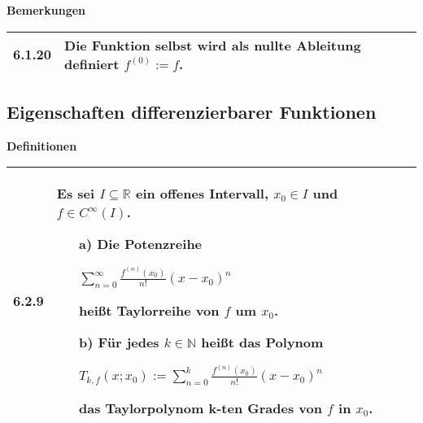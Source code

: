     \noindent
    \textbf{Bemerkungen}
    \begin{table}[H]
    \begin{tabularx}{\textwidth}{X m{16cm}}
        \toprule

        6.1.20& Die Funktion selbst wird als nullte Ableitung definiert $f^{(0)} := f$. \\

        \bottomrule
    \end{tabularx}
    \end{table}


\subsection{Eigenschaften differenzierbarer Funktionen}
    \noindent
    \textbf{Definitionen}
    \begin{table}[H]  
    \begin{tabularx}{\textwidth}{X m{16cm}}
        \toprule

        6.2.9 & Es sei $I \subseteq \mathbb{R}$ ein offenes Intervall, $x_0 \in I$ und $f \in C^{\infty}(I)$.
                \begin{itemize}
                    \item[a)] Die Potenzreihe \hfill \break
                                \centerline{$\sum^{\infty}_{n=0} \frac{f^{(n)}(x_0)}{n!}(x-x_0)^n$}
                                heißt \textbf{Taylorreihe} von $f$ um $x_0$.
                    \item[b)] Für jedes $k \in \mathbb{N}$ heißt das Polynom \hfill \break
                                \centerline{$T_{k,f}(x;x_0) := \sum^{k}_{n=0} \frac{f^{(n)}(x_0)}{n!}(x-x_0)^n$}
                                das \textbf{Taylorpolynom k-ten Grades} von $f$ in $x_0$.
                \end{itemize}  \\

        \bottomrule

    \end{tabularx}
    \end{table}

